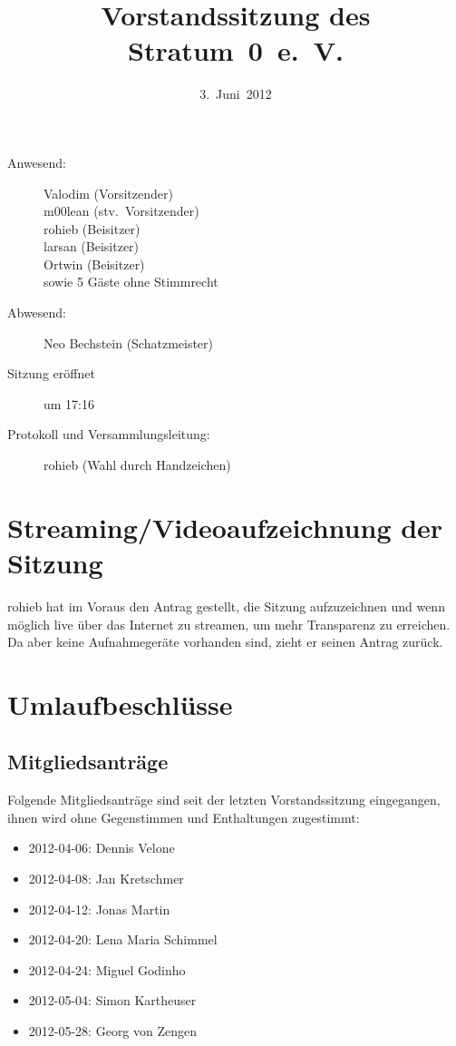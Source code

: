 \documentclass[a4paper,12pt]{scrartcl}
\title{Vorstandssitzung des Stratum~0~e.~V.}
\date{3.~Juni~2012}
\begin{document}
\maketitle

\begin{description}
 \item[Anwesend:] Valodim (Vorsitzender) \\
    m00lean (stv.~Vorsitzender) \\
    rohieb (Beisitzer) \\
    larsan (Beisitzer) \\
		Ortwin (Beisitzer) \\
    sowie 5 Gäste ohne Stimmrecht
	\item[Abwesend:] Neo Bechstein (Schatzmeister)
  \item[Sitzung eröffnet] um 17:16
  \item[Protokoll und Versammlungsleitung:] rohieb (Wahl durch Handzeichen)
\end{description}

\section{Streaming/Videoaufzeichnung der Sitzung}
\withdrawn
rohieb hat im Voraus den Antrag gestellt, die Sitzung aufzuzeichnen und wenn
möglich live über das Internet zu streamen, um mehr Transparenz zu erreichen. Da
aber keine Aufnahmegeräte vorhanden sind, zieht er seinen Antrag zurück.

\section{Umlaufbeschlüsse}
\subsection{Mitgliedsanträge}
Folgende Mitgliedsanträge sind seit der letzten Vorstandssitzung eingegangen,
ihnen wird ohne Gegenstimmen und Enthaltungen zugestimmt:
\begin{itemize}
  \item 2012-04-06: Dennis Velone
  \item 2012-04-08: Jan Kretschmer
  \item 2012-04-12: Jonas Martin
  \item 2012-04-20: Lena Maria Schimmel
  \item 2012-04-24: Miguel Godinho
  \item 2012-05-04: Simon Kartheuser
  \item 2012-05-28: Georg von Zengen
\end{itemize}
\end{document}
